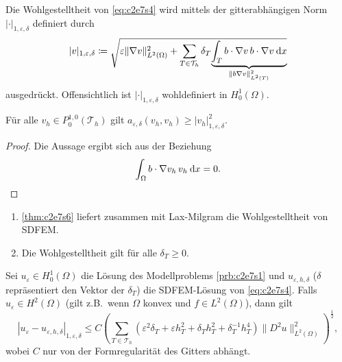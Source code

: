 \documentclass[../skript.tex]{subfiles}
\begin{document}
Die Wohlgestelltheit von \cref{eq:c2e7s4} wird mittels der gitterabhängigen Norm $|\cdot|_{1,\varepsilon,\delta}$ definiert durch
\[
	|v|_{1,\varepsilon,\delta} \coloneqq \sqrt{ \varepsilon\|\nabla v\|_{L^2(\Omega)}^2 + \sum_{T\in\mathcal{T}_h} \delta_T \smash[b]{ \underbrace{\int_T b\cdot\nabla v\,b\cdot\nabla v \dx}_{\|b\nabla v\|_{L^2(T)}^2} } } \vphantom{\underbrace{\int_T b\cdot\nabla v\,b\cdot\nabla v \dx}_{\|b\nabla v\|_{L^2(T)}^2} }
\]
ausgedrückt. Offensichtlich ist $|\cdot|_{1,\varepsilon,\delta}$ wohldefiniert in $H^1_0(\Omega)$.
\begin{theorem}\label{thm:c2e7s6}
	Für alle $v_h\in P^{1,0}_0(\mathcal{T}_h)$ gilt $a_{\varepsilon,\delta}(v_h,v_h)\geq |v_h|_{1,\varepsilon,\delta}^2$.
\end{theorem} 
\begin{proof}
	Die Aussage ergibt sich aus der Beziehung 
	\[
		\int_\Omega b\cdot\nabla v_h\,v_h\:\mathrm{d}x = 0.
	\]
\end{proof}
\begin{remark}\label{rem:c2e7s7}
	\begin{enumerate}
		\item \cref{thm:c2e7s6} liefert zusammen mit Lax-Milgram die Wohlgestelltheit von SDFEM.
		\item Die Wohlgestelltheit gilt für alle $\delta_T\geq 0$.
	\end{enumerate}
\end{remark}
\begin{theorem}\label{thm:c2e7s8}
	Sei $u_\varepsilon\in H^1_0(\Omega)$ die Lösung des Modellproblems \cref{prb:c2e7s1} und $u_{\varepsilon,h,\delta}$ ($\delta$ repräsentiert den Vektor der $\delta_T$) die SDFEM-Lösung von \cref{eq:c2e7s4}. Falls $u_\varepsilon\in H^2(\Omega)$ (gilt z.B.\ wenn $\Omega$ konvex und $f\in L^2(\Omega)$), dann gilt 
	\[
		|u_\varepsilon-u_{\varepsilon,h,\delta}|_{1,\varepsilon,\delta} \leq C\left( \sum_{T\in\mathcal{T}_h} (\varepsilon^2\delta_T + \varepsilon h_T^2+\delta_T h_T^2 + \delta_T^{-1}h_T^4 ) \|D^2u\|_{L^2(\Omega)}^2\right)^{\frac{1}{2}},
	\]
	wobei $C$ nur von der Formregularität des Gitters abhängt. 
\end{theorem}
\end{document}
